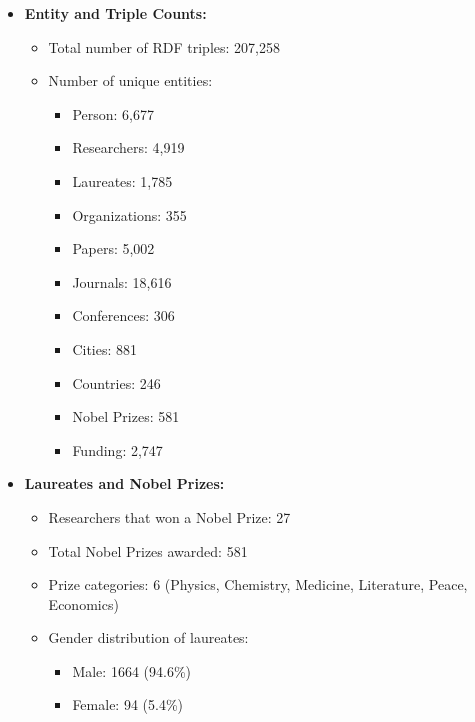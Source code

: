 \documentclass{article}
\begin{document}
\begin{itemize}
	\item \textbf{Entity and Triple Counts:}
	      \begin{itemize}
		      \item Total number of RDF triples: 207,258
		      \item Number of unique entities:
		            \begin{itemize}
			            \item Person: 6,677
			            \item Researchers: 4,919
			            \item Laureates: 1,785
			            \item Organizations: 355
			            \item Papers: 5,002
			            \item Journals: 18,616
			            \item Conferences: 306
			            \item Cities: 881
			            \item Countries: 246
			            \item Nobel Prizes: 581
			            \item Funding: 2,747
		            \end{itemize}
	      \end{itemize}

	\item \textbf{Laureates and Nobel Prizes:}
	      \begin{itemize}
		      \item Researchers that won a Nobel Prize: 27
		      \item Total Nobel Prizes awarded: 581
		      \item Prize categories: 6 (Physics, Chemistry, Medicine, Literature, Peace, Economics)
		      \item Gender distribution of laureates:
		            \begin{itemize}
			            \item Male: 1664 (94.6\%)
			            \item Female: 94 (5.4\%)
		            \end{itemize}
	      \end{itemize}
\end{itemize}
\end{document}
